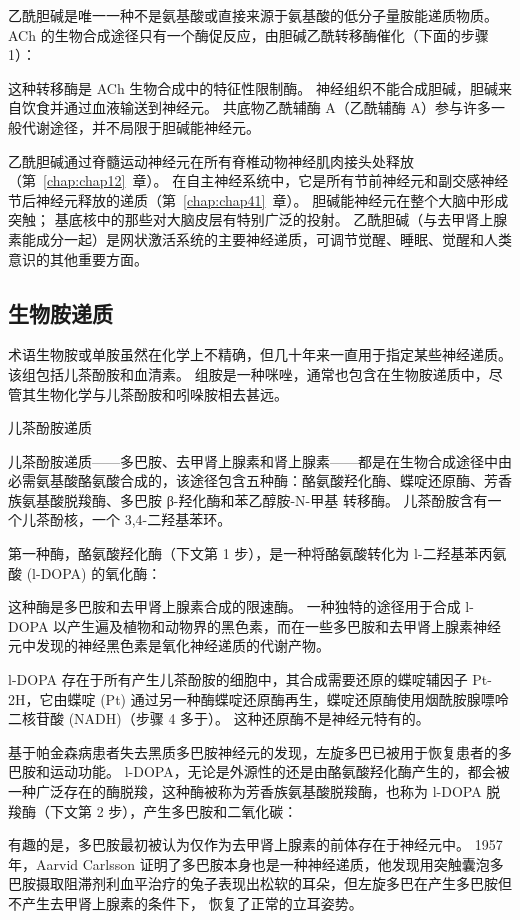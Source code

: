 乙酰胆碱是唯一一种不是氨基酸或直接来源于氨基酸的低分子量胺能递质物质。
ACh 的生物合成途径只有一个酶促反应，由胆碱乙酰转移酶催化（下面的步骤 1）：


这种转移酶是 ACh 生物合成中的特征性限制酶。
神经组织不能合成胆碱，胆碱来自饮食并通过血液输送到神经元。
共底物乙酰辅酶 A（乙酰辅酶 A）参与许多一般代谢途径，并不局限于胆碱能神经元。


乙酰胆碱通过脊髓运动神经元在所有脊椎动物神经肌肉接头处释放（第~\ref{chap:chap12}~章）。
在自主神经系统中，它是所有节前神经元和副交感神经节后神经元释放的递质（第~\ref{chap:chap41}~章）。
胆碱能神经元在整个大脑中形成突触；
基底核中的那些对大脑皮层有特别广泛的投射。
乙酰胆碱（与去甲肾上腺素能成分一起）是网状激活系统的主要神经递质，可调节觉醒、睡眠、觉醒和人类意识的其他重要方面。




\subsection{生物胺递质}

术语生物胺或单胺虽然在化学上不精确，但几十年来一直用于指定某些神经递质。
该组包括儿茶酚胺和血清素。
组胺是一种咪唑，通常也包含在生物胺递质中，尽管其生物化学与儿茶酚胺和吲哚胺相去甚远。


儿茶酚胺递质

儿茶酚胺递质——多巴胺、去甲肾上腺素和肾上腺素——都是在生物合成途径中由必需氨基酸酪氨酸合成的，该途径包含五种酶：酪氨酸羟化酶、蝶啶还原酶、芳香族氨基酸脱羧酶、多巴胺 β-羟化酶和苯乙醇胺-N-甲基 转移酶。 儿茶酚胺含有一个儿茶酚核，一个 3,4-二羟基苯环。


第一种酶，酪氨酸羟化酶（下文第 1 步），是一种将酪氨酸转化为 l-二羟基苯丙氨酸 (l-DOPA) 的氧化酶：


这种酶是多巴胺和去甲肾上腺素合成的限速酶。
一种独特的途径用于合成 l-DOPA 以产生遍及植物和动物界的黑色素，而在一些多巴胺和去甲肾上腺素神经元中发现的神经黑色素是氧化神经递质的代谢产物。


l-DOPA 存在于所有产生儿茶酚胺的细胞中，其合成需要还原的蝶啶辅因子 Pt-2H，它由蝶啶 (Pt) 通过另一种酶蝶啶还原酶再生，蝶啶还原酶使用烟酰胺腺嘌呤二核苷酸 (NADH)（步骤 4 多于）。
这种还原酶不是神经元特有的。


基于帕金森病患者失去黑质多巴胺神经元的发现，左旋多巴已被用于恢复患者的多巴胺和运动功能。
l-DOPA，无论是外源性的还是由酪氨酸羟化酶产生的，都会被一种广泛存在的酶脱羧，这种酶被称为芳香族氨基酸脱羧酶，也称为 l-DOPA 脱羧酶（下文第 2 步），产生多巴胺和二氧化碳：


有趣的是，多巴胺最初被认为仅作为去甲肾上腺素的前体存在于神经元中。
1957 年，Aarvid Carlsson 证明了多巴胺本身也是一种神经递质，他发现用突触囊泡多巴胺摄取阻滞剂利血平治疗的兔子表现出松软的耳朵，但左旋多巴在产生多巴胺但不产生去甲肾上腺素的条件下， 恢复了正常的立耳姿势。


